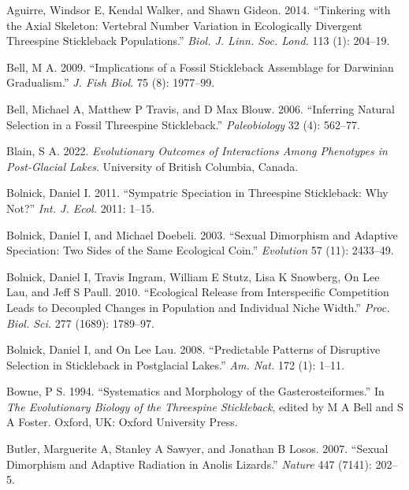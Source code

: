 \documentclass[
  12pt,
]{article}
\newlength{\cslhangindent}
\newlength{\cslentryspacingunit} %
\newenvironment{CSLReferences}[2] %
 {%
  \setlength{\parindent}{0pt}
  \ifodd #1
  \let\oldpar\par
  \def\par{\hangindent=\cslhangindent\oldpar}
  \fi
  \setlength{\parskip}{#2\cslentryspacingunit}
 }%
 {}
\begin{document}
\begin{CSLReferences}{1}{0}
\leavevmode{}%
Aguirre, Windsor E, Kendal Walker, and Shawn Gideon. 2014. {``Tinkering
with the Axial Skeleton: Vertebral Number Variation in Ecologically
Divergent Threespine Stickleback Populations.''} \emph{Biol. J. Linn.
Soc. Lond.} 113 (1): 204--19.

\leavevmode{}%
Bell, M A. 2009. {``Implications of a Fossil Stickleback Assemblage for
Darwinian Gradualism.''} \emph{J. Fish Biol.} 75 (8): 1977--99.

\leavevmode{}%
Bell, Michael A, Matthew P Travis, and D Max Blouw. 2006. {``Inferring
Natural Selection in a Fossil Threespine Stickleback.''}
\emph{Paleobiology} 32 (4): 562--77.

\leavevmode{}%
Blain, S A. 2022. \emph{Evolutionary Outcomes of Interactions Among
Phenotypes in Post-Glacial Lakes}. University of British Columbia,
Canada.

\leavevmode{}%
Bolnick, Daniel I. 2011. {``Sympatric Speciation in Threespine
Stickleback: Why Not?''} \emph{Int. J. Ecol.} 2011: 1--15.

\leavevmode{}%
Bolnick, Daniel I, and Michael Doebeli. 2003. {``Sexual Dimorphism and
Adaptive Speciation: Two Sides of the Same Ecological Coin.''}
\emph{Evolution} 57 (11): 2433--49.

\leavevmode{}%
Bolnick, Daniel I, Travis Ingram, William E Stutz, Lisa K Snowberg, On
Lee Lau, and Jeff S Paull. 2010. {``Ecological Release from
Interspecific Competition Leads to Decoupled Changes in Population and
Individual Niche Width.''} \emph{Proc. Biol. Sci.} 277 (1689): 1789--97.

\leavevmode{}%
Bolnick, Daniel I, and On Lee Lau. 2008. {``Predictable Patterns of
Disruptive Selection in Stickleback in Postglacial Lakes.''} \emph{Am.
Nat.} 172 (1): 1--11.

\leavevmode{}%
Bowne, P S. 1994. {``Systematics and Morphology of the
Gasterosteiformes.''} In \emph{The Evolutionary Biology of the
Threespine Stickleback}, edited by M A Bell and S A Foster. Oxford, UK:
Oxford University Press.

\leavevmode{}%
Butler, Marguerite A, Stanley A Sawyer, and Jonathan B Losos. 2007.
{``Sexual Dimorphism and Adaptive Radiation in Anolis Lizards.''}
\emph{Nature} 447 (7141): 202--5.


\end{CSLReferences}
\end{document}
